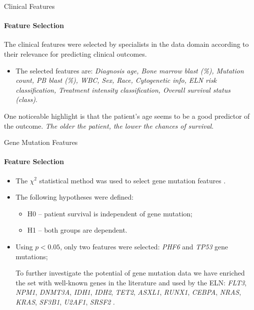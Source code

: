 \begin{frame}{Clinical Features}
\framesubtitle{Feature Selection}
The clinical features were selected by specialists in the data domain according to their relevance for predicting clinical outcomes.

\vspace{0.25cm}
\begin{itemize}
    \item The selected features are:
    \emph{Diagnosis age, Bone marrow blast (\%), Mutation count, PB blast (\%), WBC, Sex, Race, Cytogenetic info, ELN risk classification, Treatment intensity classification,  Overall survival status (class)}.
\end{itemize}
\vspace{0.25cm}

One noticeable highlight is that the patient's age seems to be a good predictor of the outcome. \emph{The older the patient, the lower the chances of survival}. 

\end{frame}



\begin{frame}{Gene Mutation Features}
\framesubtitle{Feature Selection}
\begin{itemize}
    \item The $\chi^2$ statistical method was used to select gene mutation features \cite{Rahman-2019}.
    \item The following hypotheses were defined:
    \begin{itemize}
        \item H0 -- patient survival is independent of gene mutation;
        \item H1 -- both groups are dependent.
    \end{itemize}
    \item Using $p < 0.05$, only two features were selected: \textit{PHF6} and \textit{TP53} gene mutations;

    \begin{block}{}
    \vspace{0.25cm}
    To further investigate the potential of gene mutation data we have enriched the set with well-known genes in the literature and used by the ELN: \textit{FLT3}, \textit{NPM1}, \textit{DNMT3A}, \textit{IDH1}, \textit{IDH2}, \textit{TET2}, \textit{ASXL1}, \textit{RUNX1}, \textit{CEBPA}, \textit{NRAS}, \textit{KRAS}, \textit{SF3B1}, \textit{U2AF1}, \textit{SRSF2} \cite{Lagunas-Rangel-2017, Pimenta-2021, Charrot-2020} \cite{Dohner-2022}.
    \vspace{0.25cm}
\end{block}
   
\end{itemize}
\end{frame}




